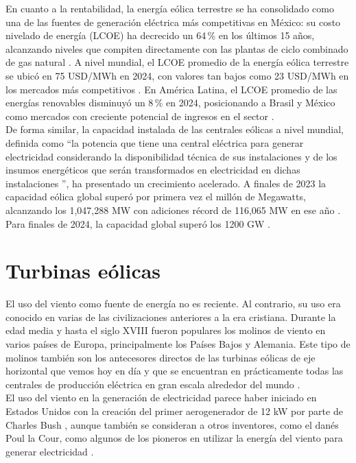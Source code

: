 En cuanto a la rentabilidad, la energía eólica terrestre se ha consolidado como una de 
las fuentes de generación eléctrica más competitivas en México: su costo 
nivelado de energía (LCOE) ha decrecido un 64\,\% en los últimos 15 años, 
alcanzando niveles que compiten directamente con las plantas de ciclo 
combinado de gas natural \cite{Lazard2024}. A nivel mundial, el LCOE 
promedio de la energía eólica terrestre se ubicó en 75 USD/MWh en 2024, 
con valores tan bajos como 23 USD/MWh en los mercados más competitivos 
\cite{WoodMackenzie2024}. En América Latina, el LCOE promedio de las 
energías renovables disminuyó un 8\,\% en 2024, posicionando a Brasil y 
México como mercados con creciente potencial de ingresos en el sector 
\cite{WoodMackenzie2024}.
\\

De forma similar, la capacidad instalada de las centrales eólicas a nivel 
mundial, definida como ``la potencia que tiene una central eléctrica para 
generar electricidad considerando la disponibilidad técnica de sus 
instalaciones y de los insumos energéticos que serán transformados en 
electricidad en dichas instalaciones \cite{CONACYT2022}'', ha presentado un 
crecimiento acelerado. A finales de 2023 la capacidad eólica global superó 
por primera vez el millón de Megawatts, alcanzando los 1{,}047{,}288 MW 
con adiciones récord de 116{,}065 MW en ese año \cite{WWEA2023}. Para 
finales de 2024, la capacidad global superó los 1200 GW \cite{WWEA2024}.

\section{Turbinas eólicas}

El uso del viento como fuente de energía no es reciente. Al contrario, su uso
era conocido en varias de las civilizaciones anteriores a la era cristiana. Durante la edad 
media y hasta el siglo XVIII fueron populares los molinos de viento en varios países de Europa, 
principalmente los Países Bajos y Alemania. Este tipo de molinos también son los antecesores 
directos de las turbinas eólicas de eje horizontal que vemos hoy en día y que se encuentran en 
prácticamente todas las centrales de producción eléctrica en gran escala alrededor del mundo \cite{Hau2013}.
\\

El uso del viento en la generación de electricidad parece haber iniciado en Estados Unidos 
con la creación del primer aerogenerador de 12 kW por parte de Charles Bush \cite{Burton2011}, 
aunque también se consideran a otros inventores, como el danés Poul la Cour, como algunos de 
los pioneros en utilizar la energía del viento para generar electricidad \cite{Hansen2015}.
\\

